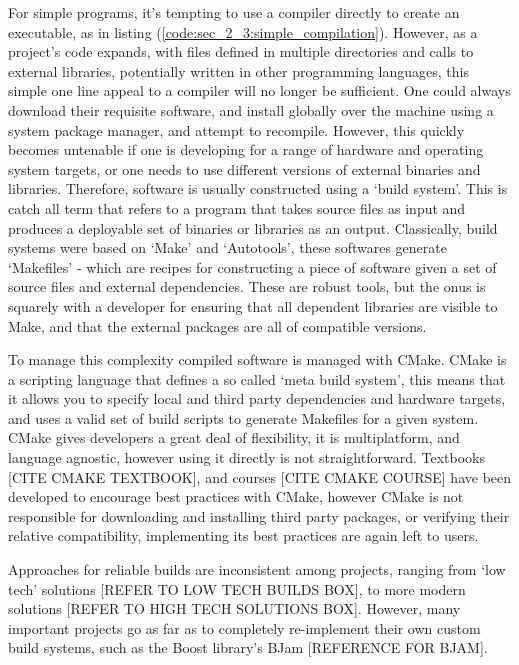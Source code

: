 For simple programs, it's tempting to use a compiler directly to create an executable, as in listing (\ref{code:sec_2_3:simple_compilation}). However, as a project's code expands, with files defined in multiple directories and calls to external libraries, potentially written in other programming languages, this simple one line appeal to a compiler will no longer be sufficient. One could always download their requisite software, and install globally over the machine using a system package manager, and attempt to recompile. However, this quickly becomes untenable if one is developing for a range of hardware and operating system targets, or one needs to use different versions of external binaries and libraries. Therefore, software is usually constructed using a `build system'. This is catch all term that refers to a program that takes source files as input and produces a deployable set of binaries or libraries as an output. Classically, build systems were based on `Make' and `Autotools', these softwares generate `Makefiles' - which are recipes for constructing a piece of software given a set of source files and external dependencies. These are robust tools, but the onus is squarely with a developer for ensuring that all dependent libraries are visible to Make, and that the external packages are all of compatible versions.

To manage this complexity compiled software is managed with CMake. CMake is a scripting language that defines a so called `meta build system', this means that it allows you to specify local and third party dependencies and hardware targets, and uses a valid set of build scripts to generate Makefiles for a given system. CMake gives developers a great deal of flexibility, it is multiplatform, and language agnostic, however using it directly is not straightforward. Textbooks [CITE CMAKE TEXTBOOK], and courses [CITE CMAKE COURSE] have been developed to encourage best practices with CMake, however CMake is not responsible for downloading and installing third party packages, or verifying their relative compatibility, implementing its best practices are again left to users.

Approaches for reliable builds are inconsistent among projects, ranging from `low tech' solutions [REFER TO LOW TECH BUILDS BOX], to more modern solutions [REFER TO HIGH TECH SOLUTIONS BOX]. However, many important projects go as far as to completely re-implement their own custom build systems, such as the Boost library's BJam [REFERENCE FOR BJAM].

